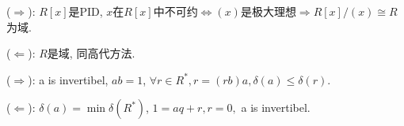 \documentclass{report}
\begin{document}

\sol
{

    ($\Rightarrow$): $R[x]$是PID, $x$在$R[x]$中不可约$\iff (x)$是极大理想$\Rightarrow R[x]/(x) \cong R$为域. 

    ($\Leftarrow$): $R$是域, 同高代方法.
    
}


\sol
{

    ($\Rightarrow$): a is invertibel, $ab=1$, $\forall r\in R^*, r=(rb)a, \delta(a) \leq \delta (r)$.

    ($\Leftarrow$): $ \delta(a)= \min \delta(R^*)$, $1=aq+r, r=0, $ a is invertibel. 
}
\end{document}
